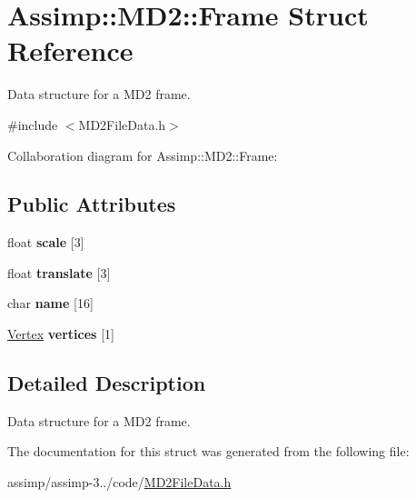 \hypertarget{struct_assimp_1_1_m_d2_1_1_frame}{\section{Assimp\+:\+:M\+D2\+:\+:Frame Struct Reference}
\label{struct_assimp_1_1_m_d2_1_1_frame}
}


Data structure for a M\+D2 frame.  




{\ttfamily \#include $<$M\+D2\+File\+Data.\+h$>$}



Collaboration diagram for Assimp\+:\+:M\+D2\+:\+:Frame\+:
\subsection*{Public Attributes}
\begin{DoxyCompactItemize}
\item 
\hypertarget{struct_assimp_1_1_m_d2_1_1_frame_a0a1e1790c9c1fa7264924c0017c94a47}{float {\bfseries scale} \mbox{[}3\mbox{]}}\label{struct_assimp_1_1_m_d2_1_1_frame_a0a1e1790c9c1fa7264924c0017c94a47}

\item 
\hypertarget{struct_assimp_1_1_m_d2_1_1_frame_a6fda4bfa4ea4fab522457b5c186400e3}{float {\bfseries translate} \mbox{[}3\mbox{]}}\label{struct_assimp_1_1_m_d2_1_1_frame_a6fda4bfa4ea4fab522457b5c186400e3}

\item 
\hypertarget{struct_assimp_1_1_m_d2_1_1_frame_af1f57f4518353494ddc57674b9697a15}{char {\bfseries name} \mbox{[}16\mbox{]}}\label{struct_assimp_1_1_m_d2_1_1_frame_af1f57f4518353494ddc57674b9697a15}

\item 
\hypertarget{struct_assimp_1_1_m_d2_1_1_frame_a16caa7e1dbef9c5550d88cfcb5308b02}{\hyperlink{struct_assimp_1_1_m_d2_1_1_vertex}{Vertex} {\bfseries vertices} \mbox{[}1\mbox{]}}\label{struct_assimp_1_1_m_d2_1_1_frame_a16caa7e1dbef9c5550d88cfcb5308b02}

\end{DoxyCompactItemize}


\subsection{Detailed Description}
Data structure for a M\+D2 frame. 

The documentation for this struct was generated from the following file\+:\begin{DoxyCompactItemize}
\item 
assimp/assimp-\/3../code/\hyperlink{_m_d2_file_data_8h}{M\+D2\+File\+Data.\+h}\end{DoxyCompactItemize}

